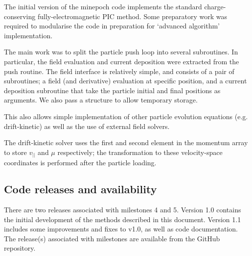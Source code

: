 \documentclass{article}
\begin{document}
The initial version of the minepoch code implements the standard charge-conserving fully-electromagnetic PIC method. Some preparatory work was required to modularise the code in preparation for `advanced algorithm' implementation.

The main work was to  split the particle push loop into several subroutines. In particular, the field evaluation and current deposition were extracted from the push routine. The field interface is relatively simple, and consists of a pair of subroutines; a field (and derivative) evaluation at specific position, and a current deposition subroutine that take the particle initial and final positions as arguments. We also pass a structure
to allow temporary storage.

This also allows simple implementation of other particle evolution equations (e.g. drift-kinetic) as well as the use of external field solvers.

The drift-kinetic solver uses the first and second element in the momentum array to store $v_{||}$ and $\mu$ respectively; the transformation to these velocity-space coordinates is performed after the particle loading.

\subsection{Code releases and availability}

There are two releases associated with milestones 4 and 5. Version 1.0 contains the initial development of the methods described in this document. Version 1.1 includes some improvements and fixes to v1.0, as well as code documentation. The release(s) associated with milestones are available from the GitHub repository.


\end{document}

